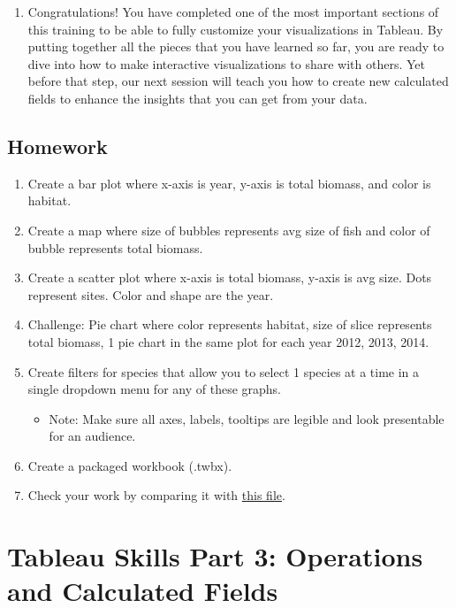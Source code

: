 \documentclass[
]{book}
\providecommand{\tightlist}{%
  \setlength{\itemsep}{0pt}\setlength{\parskip}{0pt}}
\begin{document}
\begin{enumerate}
\def\labelenumi{\arabic{enumi}.}
\tightlist
\item
  Congratulations! You have completed one of the most important sections of this training to be able to fully customize your visualizations in Tableau. By putting together all the pieces that you have learned so far, you are ready to dive into how to make interactive visualizations to share with others. Yet before that step, our next session will teach you how to create new calculated fields to enhance the insights that you can get from your data.
\end{enumerate}

\hypertarget{homework}{%
\subsection{Homework}\label{homework}}

\begin{enumerate}
\def\labelenumi{\arabic{enumi}.}
\tightlist
\item
  Create a bar plot where x-axis is year, y-axis is total biomass, and color is habitat.
\item
  Create a map where size of bubbles represents avg size of fish and color of bubble represents total biomass.
\item
  Create a scatter plot where x-axis is total biomass, y-axis is avg size. Dots represent sites. Color and shape are the year.
\item
  Challenge: Pie chart where color represents habitat, size of slice represents total biomass, 1 pie chart in the same plot for each year 2012, 2013, 2014.
\item
  Create filters for species that allow you to select 1 species at a time in a single dropdown menu for any of these graphs.

  \begin{itemize}
  \tightlist
  \item
    Note: Make sure all axes, labels, tooltips are legible and look presentable for an audience.
  \end{itemize}
\item
  Create a packaged workbook (.twbx).
\item
  Check your work by comparing it with \href{files/M3S3_exercise_key.twbx}{this file}.
\end{enumerate}

\hypertarget{tableau-skills-part-3-operations-and-calculated-fields}{%
\section{Tableau Skills Part 3: Operations and Calculated Fields}\label{tableau-skills-part-3-operations-and-calculated-fields}}
\end{document}
